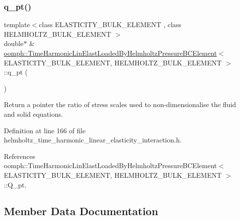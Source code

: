 \subsubsection{\texorpdfstring{q\+\_\+pt()}{q\_pt()}}
{\footnotesize\ttfamily template$<$class E\+L\+A\+S\+T\+I\+C\+I\+T\+Y\+\_\+\+B\+U\+L\+K\+\_\+\+E\+L\+E\+M\+E\+NT , class H\+E\+L\+M\+H\+O\+L\+T\+Z\+\_\+\+B\+U\+L\+K\+\_\+\+E\+L\+E\+M\+E\+NT $>$ \\
double$\ast$ \& \hyperlink{classoomph_1_1TimeHarmonicLinElastLoadedByHelmholtzPressureBCElement}{oomph\+::\+Time\+Harmonic\+Lin\+Elast\+Loaded\+By\+Helmholtz\+Pressure\+B\+C\+Element}$<$ E\+L\+A\+S\+T\+I\+C\+I\+T\+Y\+\_\+\+B\+U\+L\+K\+\_\+\+E\+L\+E\+M\+E\+NT, H\+E\+L\+M\+H\+O\+L\+T\+Z\+\_\+\+B\+U\+L\+K\+\_\+\+E\+L\+E\+M\+E\+NT $>$\+::q\+\_\+pt (\begin{DoxyParamCaption}{ }\end{DoxyParamCaption})\hspace{0.3cm}{\ttfamily [inline]}}



Return a pointer the ratio of stress scales used to non-\/dimensionalise the fluid and solid equations. 



Definition at line 166 of file helmholtz\+\_\+time\+\_\+harmonic\+\_\+linear\+\_\+elasticity\+\_\+interaction.\+h.



References oomph\+::\+Time\+Harmonic\+Lin\+Elast\+Loaded\+By\+Helmholtz\+Pressure\+B\+C\+Element$<$ E\+L\+A\+S\+T\+I\+C\+I\+T\+Y\+\_\+\+B\+U\+L\+K\+\_\+\+E\+L\+E\+M\+E\+N\+T, H\+E\+L\+M\+H\+O\+L\+T\+Z\+\_\+\+B\+U\+L\+K\+\_\+\+E\+L\+E\+M\+E\+N\+T $>$\+::\+Q\+\_\+pt.



\subsection{Member Data Documentation}
\mbox{\label{classoomph_1_1TimeHarmonicLinElastLoadedByHelmholtzPressureBCElement_a71a4d2fe30c7423a08c883843fec938b}} 
